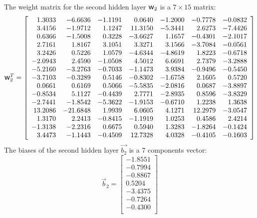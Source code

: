 \documentclass[algorithms,article,submit,pdftex,moreauthors]{Definitions/mdpi}
\DeclareRobustCommand{\w}{\mbox{\large\ensuremath{\mathsf{w}}}}
\begin{document}
The weight matrix for the second hidden layer $\w_2$ is a $7\times15$ matrix:
\begin{equation*}
\w_2^T = \left[
\begin{array}{rrrrrrr}
1.3033 & -6.6636 & -1.1191 & 0.0640 & -1.2000 & -0.7778 & -0.0832\\
3.4156 & -1.9712 & 1.1247 & 11.3150 & -5.3441 & 2.6273 & -7.4426\\
0.6366 & -1.5008 & 0.3228 & -3.6627 & 1.1657 & -0.4301 & -2.1017\\
2.7161 & 1.8167 & 3.1051 & 3.3271 & 3.1566 & -3.7084 & -0.0561\\
3.2426 & 0.5226 & 1.0579 & -4.6344 & -4.8619 & 1.8223 & -0.6718\\
-2.0943 & 2.4590 & -1.0508 & 4.5012 & 6.6691 & 2.7379 & -3.2888\\
-5.2160 & -3.2763 & -0.7033 & -1.1473 & 3.9384 & -0.9496 & -0.5450\\
-3.7103 & -0.3289 & 0.5146 & -0.8302 & -1.6758 & 2.1605 & 0.5720\\
0.0661 & 0.6169 & 0.5066 & -5.5835 & -2.0816 & 0.0687 & -3.8897\\
-0.8534 & 5.1127 & -0.4439 & 2.7771 & -2.8935 & 0.8596 & -3.8329\\
-2.7441 & -1.8542 & -5.3622 & -1.9153 & -0.6710 & 1.2238 & 1.3638\\
13.2086 & -21.6848 & 1.9939 & 6.0605 & 4.1271 & 12.2979 & -3.0547\\
1.3170 & 2.2413 & -0.8415 & -1.1919 & 1.0253 & 0.4586 & 2.4214\\
-1.3138 & -2.2316 & 0.6675 & 0.5940 & 1.3283 & -1.8264 & -0.1424\\
3.4473 & -1.1443 & -0.4509 & 12.7328 & 4.0328 & -0.4105 & -0.1603\\
\end{array}\right]
\end{equation*}
The biases of the second hidden layer $\overrightarrow{b_2}$ is a 7 components vector:
\begin{equation*}
\overrightarrow{b}_2 = \left[
\begin{array}{r}
-1.8551\\
-0.7994\\
-0.8867\\
0.5204\\
-3.4375\\
-0.7264\\
-0.4300\\
\end{array}\right]
\end{equation*}
\end{document}
